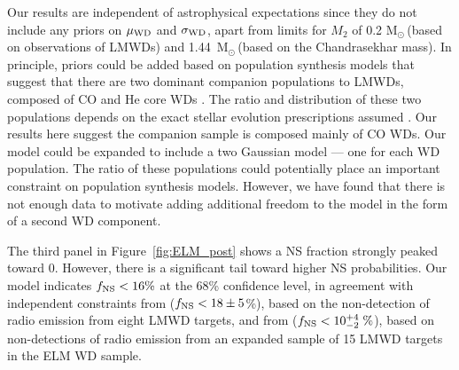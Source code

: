 \documentclass[apjl]{emulateapj}
\newcommand{\Msun}{\ifmmode {{\rm M}_{\odot}}\else M$_{\odot}$\fi}
\newcommand{\wdupper}{1.44}
\begin{document}
Our results are independent of astrophysical expectations since they do not include any priors on $\mu_{\rm WD}$ and $\sigma_{\rm WD}$, apart from limits for $M_2$ of 0.2 \Msun\,(based on observations of LMWDs) and \wdupper~\Msun\,(based on the Chandrasekhar mass). In principle, priors could be added based on population synthesis models that suggest that there are two dominant companion populations to LMWDs, composed of CO and He core WDs \citep{han98}. The ratio and distribution of these two populations depends on the exact stellar evolution prescriptions assumed \citep[see discussion in, e.g., ][]{toonen12}. Our results here suggest the companion sample is composed mainly of CO WDs. Our model could be expanded to include a two Gaussian model --- one for each WD population. The ratio of these populations could potentially place an important constraint on population synthesis models. However, we have found that there is not enough data to motivate adding additional freedom to the model in the form of a second WD component.


The third panel in Figure~\ref{fig:ELM_post} shows a NS fraction strongly peaked toward 0. However, there is a significant tail toward higher NS probabilities. Our model indicates $f_{\rm NS} <16\%$ at the 68\% confidence level, in agreement with independent constraints from \citet{vLeeuwen07} ($f_{\rm NS}<18\pm5$\%), based on the non-detection of radio emission from eight LMWD targets, and from \citet{agueros09b} ($f_{\rm NS}<10\substack{+4 \\ -2}~\%$), based on non-detections of radio emission from an expanded sample of 15 LMWD targets in the ELM WD sample. 

\end{document}
